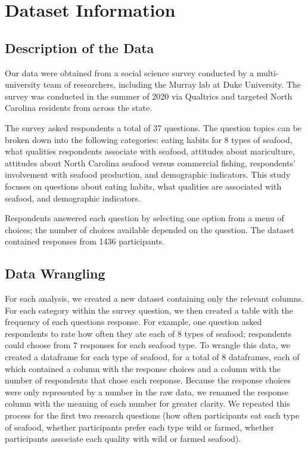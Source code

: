 \documentclass[
  12pt,
]{article}
\begin{document}
\newpage

\hypertarget{dataset-information}{%
\section{Dataset Information}\label{dataset-information}}

\hypertarget{description-of-the-data}{%
\subsection{Description of the Data}\label{description-of-the-data}}

Our data were obtained from a social science survey conducted by a
multi-university team of researchers, including the Murray lab at Duke
University. The survey was conducted in the summer of 2020 via Qualtrics
and targeted North Carolina residents from across the state.

The survey asked respondents a total of 37 questions. The question
topics can be broken down into the following categories: eating habits
for 8 types of seafood, what qualities respondents associate with
seafood, attitudes about mariculture, attitudes about North Carolina
seafood versus commercial fishing, respondents' involvement with seafood
production, and demographic indicators. This study focuses on questions
about eating habits, what qualities are associated with seafood, and
demographic indicators.

Respondents answered each question by selecting one option from a menu
of choices; the number of choices available depended on the question.
The dataset contained responses from 1436 participants.

\hypertarget{data-wrangling}{%
\subsection{Data Wrangling}\label{data-wrangling}}

For each analysis, we created a new dataset containing only the relevant
columns. For each category within the survey question, we then created a
table with the frequency of each questions response. For example, one
question asked respondents to rate how often they ate each of 8 types of
seafood; respondents could choose from 7 responses for each seafood
type. To wrangle this data, we created a dataframe for each type of
seafood, for a total of 8 dataframes, each of which contained a column
with the response choices and a column with the number of respondents
that chose each response. Because the response choices were only
represented by a number in the raw data, we renamed the response column
with the meaning of each number for greater clarity. We repeated this
process for the first two research questions (how often participants eat
each type of seafood, whether participants prefer each type wild or
farmed, whether participants associate each quality with wild or farmed
seafood).
\end{document}
